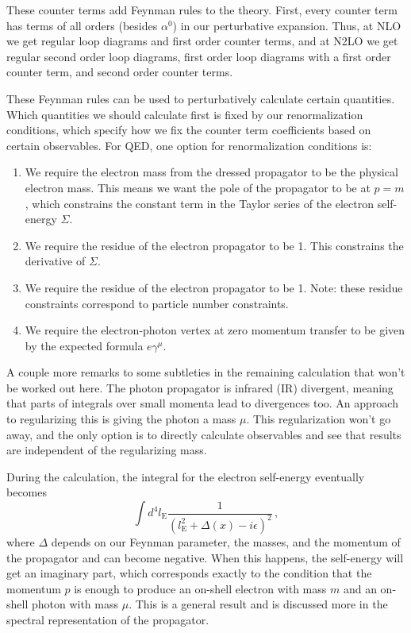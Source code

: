 \documentclass[12pt]{memoir}
\begin{document}
These counter terms add Feynman rules to the theory.
First, every counter term has terms of all orders (besides $\alpha^0$) in our perturbative expansion.
Thus, at NLO we get regular loop diagrams and first order counter terms,
and at N2LO we get regular second order loop diagrams,
first order loop diagrams with a first order counter term,
and second order counter terms.

These Feynman rules can be used to perturbatively calculate certain quantities.
Which quantities we should calculate first is fixed by our renormalization conditions,
which specify how we fix the counter term coefficients based on certain observables.
For QED, one option for renormalization conditions is:
\begin{enumerate}
  \item We require the electron mass from the dressed propagator to be the physical electron mass.
    This means we want the pole of the propagator to be at $p=m$,
    which constrains the constant term in the Taylor series of the electron self-energy $\Sigma$.
  \item We require the residue of the electron propagator to be 1.
    This constrains the derivative of $\Sigma$.
  \item We require the residue of the electron propagator to be 1.
    Note: these residue constraints correspond to particle number constraints.
  \item We require the electron-photon vertex at zero momentum transfer to be given by the expected formula
    $e \gamma^{\mu}$.
\end{enumerate}

A couple more remarks to some subtleties in the remaining calculation that won't be worked out here.
The photon propagator is infrared (IR) divergent,
meaning that parts of integrals over small momenta lead to divergences too.
An approach to regularizing this is giving the photon a mass $\mu$.
This regularization won't go away, and the only option is to directly calculate observables
and see that results are independent of the regularizing mass.

During the calculation, the integral for the electron self-energy eventually becomes
\begin{equation}
  \int d^4l_{\text{E}} \frac{1}{(l_{\text{E}}^2 + \Delta(x) - i \epsilon)^2}\,,
\end{equation}
where $\Delta$ depends on our Feynman parameter, the masses, and the momentum of the propagator
and can become negative.
When this happens, the self-energy will get an imaginary part,
which corresponds exactly to the condition that the momentum $p$ is enough to produce an on-shell electron with mass $m$ and an on-shell photon with mass $\mu$.
This is a general result and is discussed more in the spectral representation of the propagator.
\end{document}
